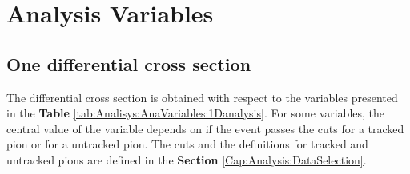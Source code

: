 \section{Analysis Variables}
\label{Cap:Analysis:Variables}

\subsection{One differential cross section}
\label{Cap:Analysis:Variables:1DAnalysis}

The differential cross section is obtained with respect to the variables presented in the \textbf{Table} \ref{tab:Analisys:AnaVariables:1Danalysis}. For some variables, the central value of the variable depends on if the event passes the cuts for a tracked pion or for a untracked pion. The cuts and the definitions for tracked and untracked pions are defined in the \textbf{Section} \ref{Cap:Analysis:DataSelection}.

